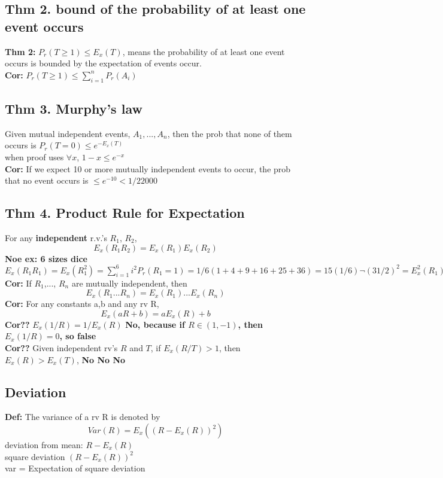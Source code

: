 \documentclass{article}
\begin{document}
\subsection{Thm 2. bound of the probability of at least one event occurs}
\textbf{Thm 2:} $P_r(T \geq 1) \leq E_x(T) $, means the probability of at least one event occurs is bounded by the expectation of events occur.  \\
\textbf{Cor:} $P_r(T \geq 1) \leq \sum_{i=1}^{n}P_r(A_i) $  \\

\subsection{Thm 3. Murphy's law}
Given mutual independent events, $A_1,..., A_n$, then the prob that none of them occurs is $P_r(T=0)\leq e^{-E_x(T)}$  \\
when proof uses $\forall x$, $1-x \leq e^{-x}$  \\
\textbf{Cor:} If we expect 10 or more mutually independent events to occur, the prob that no event occurs is $\leq e^{-10}<1/22000$  \\

\subsection{Thm 4. Product Rule for Expectation}
For any \textbf{independent} r.v.'s $R_1$, $R_2$, 
$$ E_x(R_1R_2)=E_x(R_1)E_x(R_2) $$
\textbf{Noe ex: 6 sizes dice} $E_x(R_1R_1)=E_x(R_1^2)=\sum_{i=1}^{6}i^2P_r(R_1=1)=1/6(1+4+9+16+25+36)=15(1/6)\neg (3 1/2)^2=E_x^2(R_1)$  \\
\textbf{Cor:} If  $R_1$,..., $R_n$ are mutually independent, then $$ E_x(R_1...R_n)=E_x(R_1)...E_x(R_n) $$
\textbf{Cor:} For any constants a,b and any rv R, $$ E_x(aR+b)=aE_x(R)+b $$
\textbf{Cor??} $E_x(1/R)=1/E_x(R)$  \textbf{No, because if $R\in(1,-1)$, then $E_x(1/R)=0$, so false} \\
\textbf{Cor??} Given independent rv's $R$ and $T$, if $E_x(R/T)>1$, then $E_x(R)>E_x(T)$,  \textbf{No No No} \\

\subsection{Deviation}
\textbf{Def:} The variance of a rv R is denoted by $$Var(R)=E_x((R-E_x(R))^2)$$
deviation from mean: $R-E_x(R)$  \\
square deviation $(R-E_x(R))^2$  \\
var = Expectation of square deviation  \\
\end{document}
